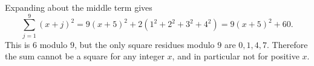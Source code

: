 Expanding about the middle term gives
\[
\sum_{j=1}^{9}(x+j)^2
=9(x+5)^2+2(1^2+2^2+3^2+4^2)=9(x+5)^2+60.
\]
This is $6$ modulo $9$, but the only square residues modulo $9$ are $0,1,4,7$. Therefore the sum cannot be a square for any integer $x$, and in particular not for positive $x$.
